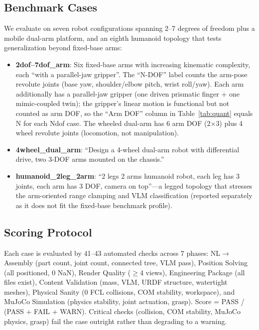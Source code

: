 \documentclass[conference]{IEEEtran}
\begin{document}
\subsection{Benchmark Cases}
We evaluate on seven robot configurations spanning 2--7 degrees of freedom plus a mobile dual-arm platform, and an eighth humanoid topology that tests generalization beyond fixed-base arms:
\begin{itemize}
    \item \textbf{2dof--7dof\_arm}: Six fixed-base arms with increasing kinematic complexity, each ``with a parallel-jaw gripper''. The ``N-DOF'' label counts the arm-pose revolute joints (base yaw, shoulder/elbow pitch, wrist roll/yaw). Each arm additionally has a parallel-jaw gripper (one driven prismatic finger + one mimic-coupled twin); the gripper's linear motion is functional but not counted as arm DOF, so the ``Arm DOF'' column in Table~\ref{tab:quant} equals N for each Ndof case. The wheeled dual-arm has 6 arm DOF (2$\times$3) plus 4 wheel revolute joints (locomotion, not manipulation).
    \item \textbf{4wheel\_dual\_arm}: ``Design a 4-wheel dual-arm robot with differential drive, two 3-DOF arms mounted on the chassis.''
    \item \textbf{humanoid\_2leg\_2arm}: ``2 legs 2 arms humanoid robot, each leg has 3 joints, each arm has 3 DOF, camera on top''---a legged topology that stresses the arm-oriented range clamping and VLM classification (reported separately as it does not fit the fixed-base benchmark profile).
\end{itemize}

\subsection{Scoring Protocol}
\label{sec:scoring}
Each case is evaluated by 41--43 automated checks across 7 phases: NL$\to$Assembly (part count, joint count, connected tree, VLM pass), Position Solving (all positioned, 0 NaN), Render Quality ($\geq$4 views), Engineering Package (all files exist), Content Validation (mass, VLM, URDF structure, watertight meshes), Physical Sanity (0 FCL collisions, COM stability, workspace), and MuJoCo Simulation (physics stability, joint actuation, grasp). Score = PASS / (PASS + FAIL + WARN). Critical checks (collision, COM stability, MuJoCo physics, grasp) fail the case outright rather than degrading to a warning.
\end{document}

